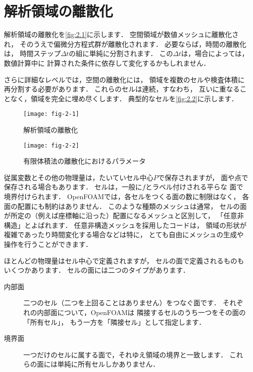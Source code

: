 \section{解析領域の離散化}
\label{sec:2.3}
解析領域の離散化を\autoref{fig:2.1}に示します．
空間領域が数値メッシュに離散化され，
そのうえで偏微分方程式群が離散化されます．
必要ならば，時間の離散化は，
時間ステップ$\Delta{t}$の組に単純に分割されます．
この$\Delta{t}$は，場合によっては，数値計算中に
計算された条件に依存して変化するかもしれません．

さらに詳細なレベルでは，空間の離散化には，
領域を複数のセルや検査体積に再分割する必要があります．
これらのセルは連続，すなわち，
互いに重なることなく，領域を完全に埋め尽くします．
典型的なセルを\autoref{fig:2.2}に示します．


\begin{figure}[ht]
 \texttt{[image: fig-2-1]}
 \caption{解析領域の離散化}
 \label{fig:2.1}
\end{figure}


\begin{figure}[ht]
 \texttt{[image: fig-2-2]}
%
%
 \caption{有限体積法の離散化におけるパラメータ}
 \label{fig:2.2}
\end{figure}


従属変数とその他の物理量は，たいていセル中心$P$で保存されますが，
面や点で保存される場合もあります．
セルは，一般に$f$とラベル付けされる平らな
%    
面で境界付けられます．
OpenFOAMでは，各セルをつくる面の数に制限はなく，
各面の配置にも制約はありません．
このような種類のメッシュは通常，
セルの面が所定の（例えば座標軸に沿った）配置になるメッシュと区別して，
「任意非構造」とよばれます．
任意非構造メッシュを採用したコードは，
領域の形状が複雑であったり時間変化する場合などは特に，
とても自由にメッシュの生成や操作を行うことができます．

ほとんどの物理量はセル中心で定義されますが，
セルの面で定義されるものもいくつかあります．
セルの面には二つのタイプがあります．
\begin{description}
 \item[内部面] 二つのセル（二つを上回ることはありません）をつなぐ面です．
            それぞれの内部面について，OpenFOAMは
            隣接するセルのうち一つをその面の「所有セル」，
            もう一方を「隣接セル」として指定します．
 \item[境界面] 一つだけのセルに属する面で，それゆえ領域の境界と一致します．
            これらの面には単純に所有セルしかありません．
\end{description}


